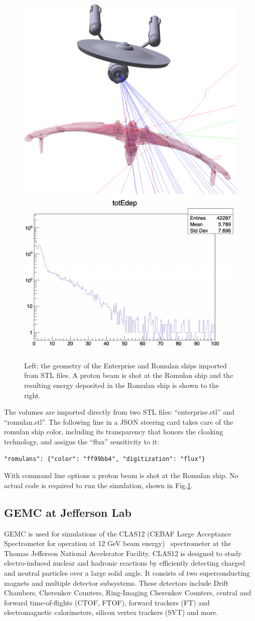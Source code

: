 \begin{figure}[h]
    \centering
    \includegraphics[width=.5\textwidth, height=0.2\textheight]{img/startrek}
    \includegraphics[width=.48\textwidth]{img/startrek_edep}
    \caption{Left: the geometry of the Enterprise and Romulan ships imported from STL files.
    A proton beam is shot at the Romulan ship and the resulting energy deposited in the Romulan ship
    is shown to the right.}
    \label{fig:cad_import}
\end{figure}


The volumes are imported directly from two STL
files: ``enterprise.stl'' and ``romulan.stl''.
The following line in a JSON steering card takes care of the romulan ship color, including its transparency that honors the cloaking technology,
and assigns the ``flux'' sensitivity to it:

\begin{verbatim}
"romulans": {"color": "ff99bb4", "digitization": "flux"}
\end{verbatim}

With command line options a proton beam is shot at the Romulan ship.
No actual code is required to run the simulation, shown in Fig.\ref{fig:cad_import}.

\subsection{GEMC at Jefferson Lab}
\label{subsec:clas12}
GEMC is used for simulations of the CLAS12 (CEBAF Large Acceptance Spectrometer
for operation at 12 GeV beam energy)~\cite{clas12_gemc} spectrometer at the Thomas Jefferson National
Accelerator Facility.
CLAS12 is designed to study electro-induced nuclear and hadronic reactions
by efficiently detecting charged and neutral particles over a large solid angle.
It consists of two superconducting magnets and multiple detector subsystems.
These detectors include Drift Chambers, Cherenkov Counters, Ring-Imaging Cherenkov Counters,
central and forward time-of-flights (CTOF, FTOF), forward trackers (FT) and electromagnetic calorimeters,
silicon vertex trackers (SVT) and more.

